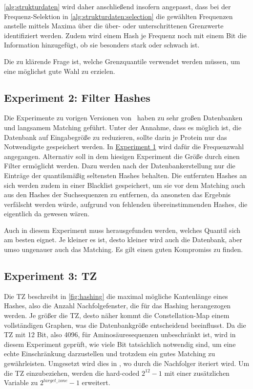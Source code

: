        \autoref{alg:strukturdaten} wird daher anschließend insofern angepasst, dass bei der Frequenz-Selektion in \autoref{alg:strukturdaten:selection} die gewählten Frequenzen anstelle mittels Maxima über die über- oder unterschrittenen Grenzwerte identifiziert werden. Zudem wird einem Hash je Frequenz noch mit einem Bit die Information hinzugefügt, ob sie besonders stark oder schwach ist.

        Die zu klärende Frage ist, welche Grenzquantile verwendet werden müssen, um eine möglichst gute Wahl zu erzielen.
    \subsection{Experiment 2: Filter Hashes} %
    \label{exp:filter_hashes}
        Die Experimente zu vorigen Versionen von \protfin\ haben zu sehr großen Datenbanken und langsamem Matching geführt. Unter der Annahme, dass es möglich ist, die Datenbank auf Eingabegröße zu reduzieren, sollte darin je Protein nur das Notwendigste gespeichert werden. In \hyperref[exp:uniref90]{Experiment 1} wird dafür die Frequenzwahl angegangen. Alternativ soll in dem hiesigen Experiment die Größe durch einen Filter ermöglicht werden. Dazu werden nach der Datenbankerstellung nur die Einträge der quantilsmäßig seltensten Hashes behalten. Die entfernten Hashes an sich werden zudem in einer Blacklist gespeichert, um sie vor dem Matching auch aus den Hashes der Suchsequenzen zu entfernen, da ansonsten das Ergebnis verfälscht werden würde, aufgrund von fehlenden übereinstimmenden Hashes, die eigentlich da gewesen wären.

        Auch in diesem Experiment muss herausgefunden werden, welches Quantil sich am besten eignet. Je kleiner es ist, desto kleiner wird auch die Datenbank, aber umso ungenauer auch das Matching. Es gilt einen guten Kompromiss zu finden.
    \subsection{Experiment 3: \acl{TZ}} %
    \label{exp:target_zone}
    Die \ac{TZ} beschreibt in \autoref{fig:hashing} die maximal mögliche Kantenlänge eines Hashes, also die Anzahl Nachfolgefenster, die für das Hashing herangezogen werden. Je größer die \ac{TZ}, desto näher kommt die Constellation-Map einem vollständigen Graphen, was die Datenbankgröße entscheidend beeinflusst. Da die \ac{TZ} mit 12 Bit, also 4096, für Aminosäuresequenzen unbeschränkt ist, wird in diesem Experiment geprüft, wie viele Bit tatsächlich notwendig sind, um eine echte Einschränkung darzustellen und trotzdem ein gutes Matching zu gewährleisten. Umgesetzt wird dies in , wo durch die Nachfolger iteriert wird. Um die \ac{TZ} einzubeziehen, werden die hard-coded $2^{12} - 1$ mit einer zusätzlichen Variable zu $2^{target\_zone} - 1$ erweitert.
